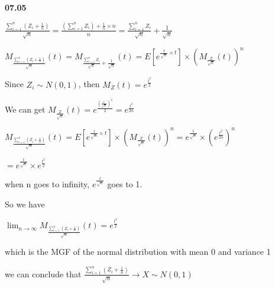 {\bf 07.05} \quad

$ \frac{\sum_{i=1}^{n} (Z_i+ \frac{1}{n} ) }{\sqrt{n}} =\frac{ (\sum_{i=1}^{n} Z_i)  + \frac{1}{n} \times n }{n}=\frac{\sum_{i=1}^{n} Z_i}{\sqrt{n}} + \frac{1}{\sqrt{n}} $ 
\par

$ M_{\frac{\sum_{i=1}^{n} (Z_i+ \frac{1}{n} ) }{\sqrt{n}} } (t)= M_{\frac{\sum_{i=1}^{n} Z_i}{\sqrt{n}} + \frac{1}{\sqrt{n}} } (t) = E[e^  { \frac{1}{\sqrt{n}} \times t} ] \times (M_ {\frac{Z}{\sqrt{n}}} ( t ) )^n $ 

Since $Z_i \sim N(0,1)$, then $M_Z (t)= e^ \frac {t^2}{2} $

We can get $M_ {\frac{Z}{\sqrt{n}}} ( t )= e^ \frac {( \frac{t}{\sqrt{n}})^2}{2} = e^ \frac{t^2}{2n}$

$ M_{\frac{\sum_{i=1}^{n} (Z_i+ \frac{1}{n} ) }{\sqrt{n}} } (t)= E[e^  { \frac{1}{\sqrt{n}} \times t} ] \times (M_ {\frac{Z}{\sqrt{n}}} ( t ) )^n = e^ \frac{t}{\sqrt{n}} \times (e^ \frac{t^2}{2n})^n $
\par

$ = e^ \frac{t}{\sqrt{n}} \times e^ \frac{t^2}{2}  $

when n goes to infinity, $ e^ \frac{t}{\sqrt{n}} $ goes to 1. \par
So we have \par
$ \lim_{n \to \infty} M_{\frac{\sum_{i=1}^{n} (Z_i+ \frac{1}{n} ) }{\sqrt{n}} } (t) =  e^ \frac{t^2}{2} $ \par
which is the MGF of the normal distribution with mean 0 and variance 1 \par
we can conclude that $ \frac{\sum_{i=1}^{n} (Z_i+ \frac{1}{n} ) }{\sqrt{n}} \to X  \sim N(0,1)$ 
